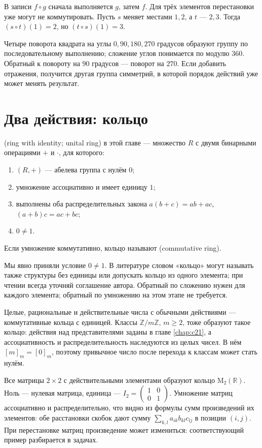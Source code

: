 В записи \(f\circ g\) сначала выполняется \(g\), затем \(f\). Для трёх элементов перестановки уже могут не коммутировать. Пусть \(s\) меняет местами \(1,2\), а \(t\) — \(2,3\). Тогда \((s\circ t)(1)=2\), но \((t\circ s)(1)=3\).

Четыре поворота квадрата на углы \(0,90,180,270\) градусов образуют группу по последовательному выполнению; сложение углов понимается по модулю \(360\). Обратный к повороту на \(90\) градусов — поворот на \(270\). Если добавить отражения, получится другая группа симметрий, в которой порядок действий уже может менять результат.

\section{Два действия: кольцо}
\begin{definition}
 (ring with identity; unital ring) в этой главе — множество \(R\) с двумя бинарными операциями \(+\) и \(\cdot\), для которого:
\begin{enumerate}[label=\arabic*.,leftmargin=2em,itemsep=2pt]
\item \((R,+)\) — абелева группа с нулём \(0\);
\item умножение ассоциативно и имеет единицу \(1\);
\item выполнены оба распределительных закона \(a(b+c)=ab+ac\), \((a+b)c=ac+bc\);
\item \(0\ne1\).
\end{enumerate}
Если умножение коммутативно, кольцо называют  (commutative ring).
\end{definition}
Мы явно приняли условие \(0\ne1\). В литературе словом «кольцо» могут называть также структуры без единицы или допускать кольцо из одного элемента; при чтении всегда уточняй соглашение автора. Обратный по сложению нужен для каждого элемента; обратный по умножению на этом этапе не требуется.

Целые, рациональные и действительные числа с обычными действиями — коммутативные кольца с единицей. Классы \(\mathbb Z/m\mathbb Z\), \(m\ge2\), тоже образуют такое кольцо: действия над представителями заданы в главе \ref{chap:c21}, а ассоциативность и распределительность наследуются из целых чисел. В нём \([m]_m=[0]_m\), поэтому привычное число после перехода к классам может стать нулём.

Все матрицы \(2\times2\) с действительными элементами образуют кольцо \(\mathrm M_2(\mathbb R)\). Ноль — нулевая матрица, единица — \(I_2=\begin{pmatrix}1&0\\0&1\end{pmatrix}\). Умножение матриц ассоциативно и распределительно, что видно из формулы сумм произведений их элементов: обе расстановки скобок дают сумму \(\sum_{k,l}a_{ik}b_{kl}c_{lj}\) в позиции \((i,j)\). При перестановке матриц произведение может измениться: соответствующий пример разбирается в задачах.

